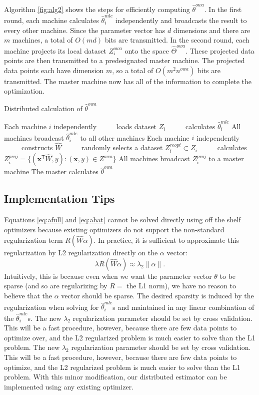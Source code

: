 \documentclass[twoside]{article}
\newcommand{\Zproj}{Z^{\textit{proj}}}
\newcommand{\Zreopt}{Z^{\textit{owa}}}
\newcommand{\nreopt}{n^{\textit{owa}}}
\newcommand{\matW}{\hat W}
\newcommand{\W}{{\hat \Theta^{\textit{owa}}}}
\newcommand{\x}{\mathbf{x}}
\newcommand{\w}{\theta}
\newcommand{\wowa}{\hat\w^{owa}}
\newcommand{\wmle}{\hat\w^{mle}}
\newcommand{\trans}[1]{\ensuremath{{#1}^{\mathsf{T}}}}
\newcommand{\ltwo}[1]{{\lVert {#1} \rVert}}
\begin{document}
Algorithm \ref{fig:alg2} shows the steps for efficiently computing $\wowa$.
In the first round, each machine calculates $\wmle_i$ independently and broadcasts the result to every other machine.
Since the parameter vector has $d$ dimensions and there are $m$ machines, a total of $O(md)$ bits are transmitted.
In the second round, each machine projects its local dataset $\Zreopt_i$ onto the space $\W$.
These projected data points are then transmitted to a predesignated master machine.
The projected data points each have dimension $m$, so a total of $O(m^2\nreopt)$ bits are transmitted.
The master machine now has all of the information to complete the optimization.

\begin{algorithm}[t]
\caption{Distributed calculation of $\wowa$}
\label{alg:distributed}
\begin{algorithmic}
\State Each machine $i$ independently
\State ~~~~~loads dataset $Z_i$
\State ~~~~~calculates $\wmle_i$
\State All machines broadcast $\wmle_i$ to all other machines
\State Each machine $i$ independently
\State ~~~~~constructs $\matW$
\State ~~~~~randomly selects a dataset $Z^{reopt}_i\subset Z_i$
\State ~~~~~calculates $\Zproj_i=\{(\trans\x\matW,y) : (\x,y)\in\Zreopt\}$
\State All machines broadcast $\Zproj_i$ to a master machine
\State The master calculates $\wowa$
\end{algorithmic}
\label{fig:alg2}
\end{algorithm}

\subsection{Implementation Tips}

Equations \ref{eq:afull} and \ref{eq:ahat} cannot be solved directly using off the shelf optimizers because existing optimizers do not support the non-standard regularization term $R(\matW\alpha)$.
In practice, it is sufficient to approximate this regularization by L2 regularization directly on the $\alpha$ vector:
\begin{equation}
\lambda R(\matW\alpha) \approx \lambda_2 \ltwo{\alpha}
.
\end{equation}
Intuitively, this is because even when we want the parameter vector $\w$ to be sparse (and so are regularizing by $R = $ the L1 norm), we have no reason to believe that the $\alpha$ vector should be sparse.
The desired sparsity is induced by the regularization when solving for $\wmle_i$s and maintained in any linear combination of the $\wmle_i$s.
The new $\lambda_2$ regularization parameter should be set by cross validation.
This will be a fast procedure, however, because there are few data points to optimize over,
and the L2 regularized problem is much easier to solve than the L1 problem.
The new $\lambda_2$ regularization parameter should be set by cross validation.
This will be a fast procedure, however, because there are few data points to optimize,
and the L2 regularized problem is much easier to solve than the L1 problem.
With this minor modification, our distributed estimator can be implemented using any existing optimizer.
\end{document}

